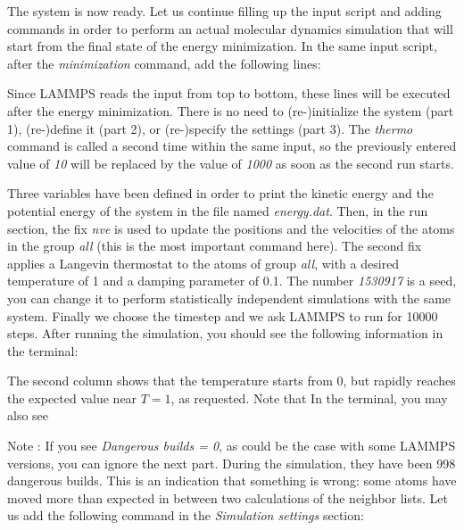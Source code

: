 \vspace{0.5cm} \noindent The system is now ready. Let us continue filling up the
input script and adding commands in order to perform an actual molecular dynamics
simulation that will start from the final state of the energy minimization.
In the same input script, after the \textit{minimization} command, add the following
lines:

\vspace{0.5cm} \noindent Since LAMMPS reads the input from top to
bottom, these lines will be executed after the energy
minimization. There is no need to (re-)initialize the system
(part 1), (re-)define it (part 2), or (re-)specify the settings
(part 3). The \textit{thermo} command is called a second time within the 
same input, so the previously entered value of \textit{10} will be replaced
by the value of \textit{1000} as soon as the second run starts.

\vspace{0.5cm} \noindent Three variables have been defined in order
to print the kinetic energy and the potential energy 
of the system in the file named \textit{energy.dat}. Then,
in the run section, the fix \textit{nve} is used to update the
positions and the velocities of the atoms in the group
\textit{all} (this is the most important command here). The second
fix applies a Langevin thermostat to the atoms of group
\textit{all}, with a desired temperature of 1 and a damping
parameter of 0.1. The number \textit{1530917} is a seed, you can
change it to perform statistically independent simulations
with the same system. Finally we choose the timestep
and we ask LAMMPS to run for 10000 steps. After running
the simulation, you should see the following information in
the terminal:

\vspace{0.5cm} \noindent The second column shows that the temperature
starts from 0, but rapidly reaches the
expected value near $T=1$, as requested. 
Note that  In the terminal, you may also see

\vspace{0.5cm} \noindent Note : If you see \textit{Dangerous builds = 0}, as could be
the case with some LAMMPS versions, you can ignore
the next part.
During the simulation, they have been 998 dangerous builds.
This is an indication that something is wrong: some atoms
have moved more than expected in between two calculations of
the neighbor lists. Let us add the following command in the
\textit{Simulation settings} section:

